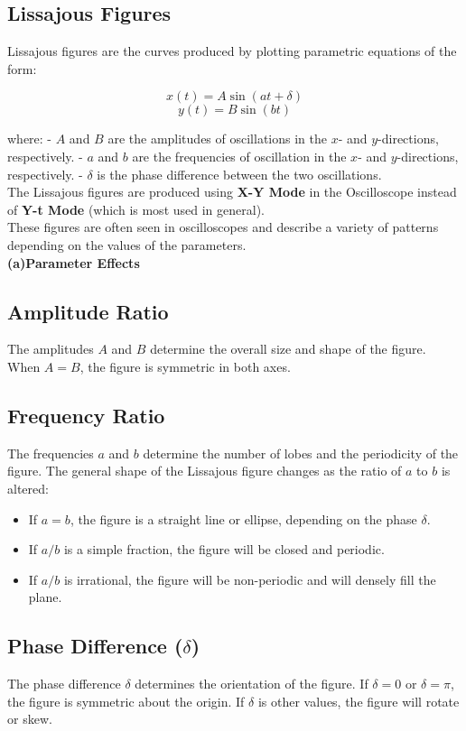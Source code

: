 \documentclass[12pt]{article}
\begin{document}
\subsection{Lissajous Figures}
Lissajous figures are the curves produced by plotting parametric equations of the form:

\[
x(t) = A \sin(a t + \delta)
\]
\[
y(t) = B \sin(b t)
\]

where:
- \( A \) and \( B \) are the amplitudes of oscillations in the \(x\)- and \(y\)-directions, respectively.
- \( a \) and \( b \) are the frequencies of oscillation in the \(x\)- and \(y\)-directions, respectively.
- \( \delta \) is the phase difference between the two oscillations.\\
The Lissajous figures are produced using \textbf{X-Y Mode} in the Oscilloscope instead of \textbf{Y-t Mode} (which is most used in general).\\

These figures are often seen in oscilloscopes and describe a variety of patterns depending on the values of the parameters.\\

\textbf{(a)Parameter Effects}
\subsection*{Amplitude Ratio}
The amplitudes \( A \) and \( B \) determine the overall size and shape of the figure. When \( A = B \), the figure is symmetric in both axes.

\subsection*{Frequency Ratio}
The frequencies \( a \) and \( b \) determine the number of lobes and the periodicity of the figure. The general shape of the Lissajous figure changes as the ratio of \( a \) to \( b \) is altered:
\begin{itemize}
    \item If \( a = b \), the figure is a straight line or ellipse, depending on the phase \( \delta \).
    \item If \( a / b \) is a simple fraction, the figure will be closed and periodic.
    \item If \( a / b \) is irrational, the figure will be non-periodic and will densely fill the plane.
\end{itemize}

\subsection*{Phase Difference (\( \delta \))}
The phase difference \( \delta \) determines the orientation of the figure. If \( \delta = 0 \) or \( \delta = \pi \), the figure is symmetric about the origin. If \( \delta \) is other values, the figure will rotate or skew.
\end{document}
